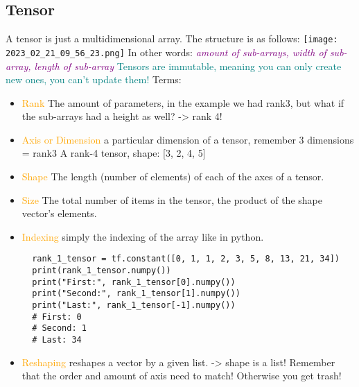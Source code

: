 \documentclass[main.tex,fontsize=8pt,paper=a4,paper=portrait,DIV=calc,]{scrartcl}
\begin{document}
\subsection{Tensor}
A tensor is just a multidimensional array. The structure is as follows:\newline
\texttt{[image: 2023\_02\_21\_09\_56\_23.png]}\newline
In other words: \textcolor{purple}{\emph{amount of sub-arrays, width of sub-array, length of sub-array}}\newline
\textcolor{teal}{Tensors are immutable, meaning you can only create new ones, you can't update them!}\newline
Terms:
\begin{itemize}
  \item \textcolor{orange}{Rank} \newline
    The amount of parameters, in the example we had rank3, but what if the sub-arrays had a height as well? -> rank 4!
\item \textcolor{orange}{Axis or Dimension}\newline
  a particular dimension of a tensor, remember 3 dimensions = rank3\newline
  A rank-4 tensor, shape: [3, 2, 4, 5]
\item \textcolor{orange}{Shape}\newline
  The length (number of elements) of each of the axes of a tensor.
\item \textcolor{orange}{Size}\newline
  The total number of items in the tensor, the product of the shape vector's elements.
\item \textcolor{orange}{Indexing}\newline
  simply the indexing of the array like in python.
  \begin{lstlisting}
  rank_1_tensor = tf.constant([0, 1, 1, 2, 3, 5, 8, 13, 21, 34])
  print(rank_1_tensor.numpy())
  print("First:", rank_1_tensor[0].numpy())
  print("Second:", rank_1_tensor[1].numpy())
  print("Last:", rank_1_tensor[-1].numpy())
  # First: 0
  # Second: 1
  # Last: 34
  \end{lstlisting}
\item \textcolor{orange}{Reshaping}\newline
  reshapes a vector by a given list. -> shape is a list!\newline
  Remember that the order and amount of axis need to match! Otherwise you get trash!
  \begin{lstlisting}

\end{lstlisting}
\end{itemize}
\end{document}
